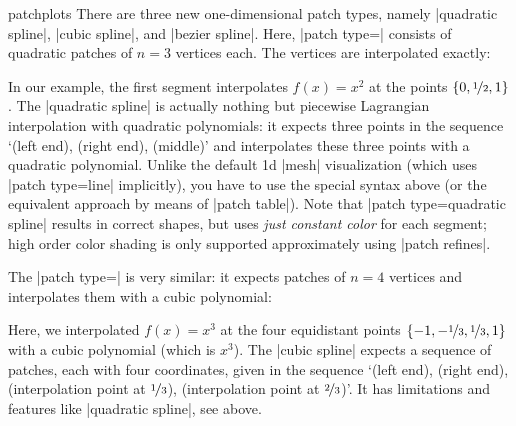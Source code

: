 {\begin{pgfplotslibrary}{patchplots}
There are three new one-dimensional patch types, namely |quadratic spline|,
|cubic spline|, and |bezier spline|. Here, |patch type=| consists
of quadratic patches of $n=3$ vertices each. The vertices are interpolated
exactly:
%
\begin{codeexample}[]
\end{codeexample}
%
\noindent In our example, the first segment interpolates $f(x)=x^2$ at the
points $\{0,\nicefrac12,1\}$. The |quadratic spline| is actually nothing but
piecewise Lagrangian interpolation with quadratic polynomials: it expects three
points in the sequence `(left end), (right end), (middle)' and interpolates
these three points with a quadratic polynomial. Unlike the default 1d |mesh|
visualization (which uses |patch type=line| implicitly), you have to use the
special syntax above (or the equivalent approach by means of |patch table|).
Note that |patch type=quadratic spline| results in correct shapes, but uses
\emph{just constant color} for each segment; high order color shading is only
supported approximately using |patch refines|.

The |patch type=| is very similar: it expects
patches of $n=4$ vertices and interpolates them with a cubic polynomial:
%
\begin{codeexample}[]
\end{codeexample}
%
\noindent Here, we interpolated $f(x)=x^3$ at the four equidistant points
$\{-1,-\nicefrac13,\nicefrac13,1\}$ with a cubic polynomial (which is $x^3$).
The |cubic spline| expects a sequence of patches, each with four coordinates,
given in the sequence `(left end), (right end), (interpolation point at
$\nicefrac13$), (interpolation point at $\nicefrac23$)'. It has limitations and
features like |quadratic spline|, see above.


\end{pgfplotslibrary}}
